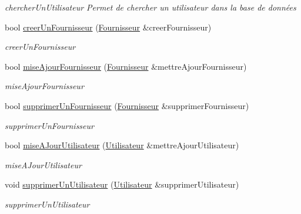 \begin{DoxyCompactItemize}
\begin{DoxyCompactList}\small\item\em chercher\+Un\+Utilisateur Permet de chercher un utilisateur dans la base de données \end{DoxyCompactList}\item 
bool \mbox{\hyperlink{class_base_de_donnees_a81715fc3632e6533d9c66a66c62e897b}{creer\+Un\+Fournisseur}} (\mbox{\hyperlink{class_fournisseur}{Fournisseur}} \&creer\+Fournisseur)
\begin{DoxyCompactList}\small\item\em creer\+Un\+Fournisseur \end{DoxyCompactList}\item 
bool \mbox{\hyperlink{class_base_de_donnees_ab49e6dfff0eecf616d9a7642ea358f31}{mise\+Ajour\+Fournisseur}} (\mbox{\hyperlink{class_fournisseur}{Fournisseur}} \&mettre\+Ajour\+Fournisseur)
\begin{DoxyCompactList}\small\item\em mise\+Ajour\+Fournisseur \end{DoxyCompactList}\item 
bool \mbox{\hyperlink{class_base_de_donnees_a4782a41060ec75d8343cb318b3b29a45}{supprimer\+Un\+Fournisseur}} (\mbox{\hyperlink{class_fournisseur}{Fournisseur}} \&supprimer\+Fournisseur)
\begin{DoxyCompactList}\small\item\em supprimer\+Un\+Fournisseur \end{DoxyCompactList}\item 
bool \mbox{\hyperlink{class_base_de_donnees_a9c2bce97f39046e66b3dd3d08c2b911a}{mise\+A\+Jour\+Utilisateur}} (\mbox{\hyperlink{class_utilisateur}{Utilisateur}} \&mettre\+Ajour\+Utilisateur)
\begin{DoxyCompactList}\small\item\em mise\+A\+Jour\+Utilisateur \end{DoxyCompactList}\item 
void \mbox{\hyperlink{class_base_de_donnees_a7ead23bc4e5d3bc897d9c6a412bbc0a6}{supprimer\+Un\+Utilisateur}} (\mbox{\hyperlink{class_utilisateur}{Utilisateur}} \&supprimer\+Utilisateur)
\begin{DoxyCompactList}\small\item\em supprimer\+Un\+Utilisateur \end{DoxyCompactList}\item 
\mbox{\label{class_base_de_donnees_a1aa6b997245767e4ba75973d59dcfaf6}} 

\end{DoxyCompactItemize}
